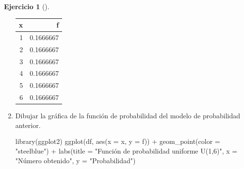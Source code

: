 \documentclass[
  a4paper,
]{scrreport}
\newenvironment{Shaded}{\begin{snugshade}}{\end{snugshade}}
\newcommand{\AttributeTok}[1]{\textcolor[rgb]{0.40,0.45,0.13}{#1}}
\newcommand{\FunctionTok}[1]{\textcolor[rgb]{0.28,0.35,0.67}{#1}}
\newcommand{\NormalTok}[1]{\textcolor[rgb]{0.00,0.23,0.31}{#1}}
\newcommand{\SpecialCharTok}[1]{\textcolor[rgb]{0.37,0.37,0.37}{#1}}
\newcommand{\StringTok}[1]{\textcolor[rgb]{0.13,0.47,0.30}{#1}}
\theoremstyle{definition}
\newtheorem{exercise}{Ejercicio}[chapter]
\theoremstyle{remark}
\begin{document}
\begin{exercise}[]
\begin{enumerate}
\begin{tcolorbox}
  \begin{table}
  \centering
  \begin{tabular}{r|r}
  \hline
  x & f\\
  \hline
  1 & 0.1666667\\
  \hline
  2 & 0.1666667\\
  \hline
  3 & 0.1666667\\
  \hline
  4 & 0.1666667\\
  \hline
  5 & 0.1666667\\
  \hline
  6 & 0.1666667\\
  \hline
  \end{tabular}
  \end{table}

  \end{tcolorbox}
\item
  Dibujar la gráfica de la función de probabilidad del modelo de
  probabilidad anterior.

  \begin{tcolorbox}[enhanced jigsaw, coltitle=black, left=2mm, colback=white, leftrule=.75mm, toptitle=1mm, breakable, bottomrule=.15mm, titlerule=0mm, bottomtitle=1mm, title=\textcolor{quarto-callout-tip-color}{\faLightbulb}\hspace{0.5em}{Solución}, arc=.35mm, toprule=.15mm, rightrule=.15mm, colframe=quarto-callout-tip-color-frame, opacityback=0, colbacktitle=quarto-callout-tip-color!10!white, opacitybacktitle=0.6]

\begin{Shaded}
\begin{Highlighting}[]
\FunctionTok{library}\NormalTok{(ggplot2)}
\FunctionTok{ggplot}\NormalTok{(df, }\FunctionTok{aes}\NormalTok{(}\AttributeTok{x =}\NormalTok{ x, }\AttributeTok{y =}\NormalTok{ f)) }\SpecialCharTok{+}
    \FunctionTok{geom\_point}\NormalTok{(}\AttributeTok{color =} \StringTok{"steelblue"}\NormalTok{) }\SpecialCharTok{+}
    \FunctionTok{labs}\NormalTok{(}\AttributeTok{title =} \StringTok{"Función de probabilidad uniforme U(1,6)"}\NormalTok{, }\AttributeTok{x =} \StringTok{"Número obtenido"}\NormalTok{, }\AttributeTok{y =} \StringTok{"Probabilidad"}\NormalTok{)}
\end{Highlighting}
\end{Shaded}

  \begin{figure}[H]


\end{figure}
\end{tcolorbox}
\end{enumerate}
\end{exercise}
\end{document}
